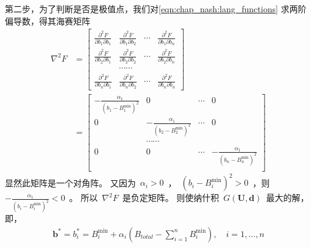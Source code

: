 第二步，为了判断是否是极值点，我们对\eqref{eqn:chap_nash:lang_functions} 求两阶偏导数，得其海赛矩阵
\begin{align*}
    \nabla ^2 F &= \left[
    \begin{array}{cccc}
        \frac{\partial ^2F}{\partial b_{1} \partial b_1} & \frac{\partial ^2F}{\partial b_{1} \partial b_2} & \cdots &  \frac{\partial ^2F}{\partial b_{1} \partial b_n}\\
        \frac{\partial ^2F}{\partial b_{2} \partial b_1} & \frac{\partial ^2F}{\partial b_{2} \partial b_2} & \cdots &  \frac{\partial ^2F}{\partial b_{2} \partial b_n}\\
         & \cdots \cdots & & \\
        \frac{\partial ^2F}{\partial b_{n} \partial b_1} & \frac{\partial ^2F}{\partial b_{n} \partial b_2} & \cdots &  \frac{\partial ^2F}{\partial b_{n} \partial b_n}
    \end{array} 
    \right] \\
    & = \left[
    \begin{array}{cccc}
        -\frac{\alpha_1}{(b_1-B_1^{\min})^2} & 0 & \cdots & 0\\
        0& -\frac{\alpha_1}{(b_2-B_2^{\min})^2} &\cdots& 0\\
        &\cdots\cdots&&\\
        0& 0 &\cdots & -\frac{\alpha_1}{(b_n-B_n^{\min})^2}\\
    \end{array}
    \right]
\end{align*}
显然此矩阵是一个对角阵。
又因为~$\alpha_i>0$~，~$(b_i - B_i^{\min})^2 > 0$~，则~$-\frac{\alpha_1}{(b_i-B_i^{\min})^2}<0$~。
所以~$\nabla ^2 F$~是负定矩阵。
则使纳什积~$G(\mathbf{U},\mathbf{d})$~最大的解，即，
\begin{align}
    \mathbf{b}^* = b_i^* = B_i^{\min} + \alpha_i \left( B_{total} - \sum_{i=1}^n B_i^{\min}  \right), \quad i=1, \ldots, n
    \label{eqn:chap_nash:nbs}
\end{align}

